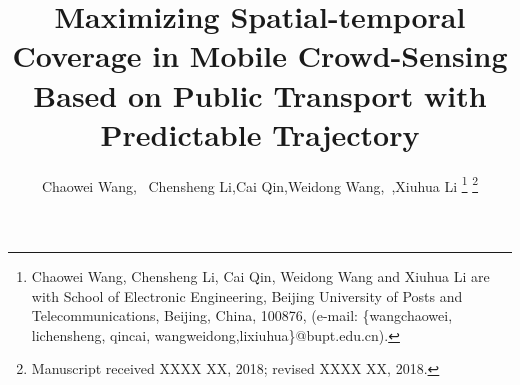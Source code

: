 \documentclass[journal]{IEEEtran}
\begin{document}
%
\title{Maximizing Spatial-temporal Coverage in Mobile Crowd-Sensing Based on Public Transport with Predictable Trajectory}
%
%
%

\author{Chaowei Wang,~
	    Chensheng Li,Cai Qin,Weidong Wang,~,Xiuhua Li
\thanks{Chaowei Wang, Chensheng Li, Cai Qin, Weidong Wang and Xiuhua Li are with School of Electronic Engineering, Beijing University of Posts and Telecommunications, Beijing, China, 100876, (e-mail: \{wangchaowei, lichensheng, qincai, wangweidong,lixiuhua\}@bupt.edu.cn).}%
\thanks{Manuscript received XXXX XX, 2018; revised XXXX XX, 2018.}}

% 
%
\end{document}
